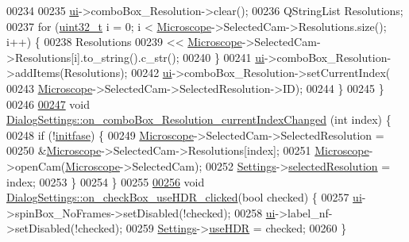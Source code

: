 \begin{DoxyCode}
00234 
00235     \hyperlink{class_dialog_settings_a5b53d91a27cdf68f77e4bdd10b6a9bba}{ui}->comboBox\_Resolution->clear();
00236     QStringList Resolutions;
00237     \textcolor{keywordflow}{for} (\hyperlink{_soil_math_types_8h_a435d1572bf3f880d55459d9805097f62}{uint32\_t} i = 0; i < \hyperlink{class_microscope}{Microscope}->SelectedCam->Resolutions.size(); i++) \{
00238       Resolutions
00239           << \hyperlink{class_microscope}{Microscope}->SelectedCam->Resolutions[i].to\_string().c\_str();
00240     \}
00241     \hyperlink{class_dialog_settings_a5b53d91a27cdf68f77e4bdd10b6a9bba}{ui}->comboBox\_Resolution->addItems(Resolutions);
00242     \hyperlink{class_dialog_settings_a5b53d91a27cdf68f77e4bdd10b6a9bba}{ui}->comboBox\_Resolution->setCurrentIndex(
00243         \hyperlink{class_microscope}{Microscope}->SelectedCam->SelectedResolution->ID);
00244   \}
00245 \}
00246 
\hypertarget{dialogsettings_8cpp_source_l00247}{}\hyperlink{class_dialog_settings_a523a72d25bd4c7623cf8164cb73736d5}{00247} \textcolor{keywordtype}{void} \hyperlink{class_dialog_settings_a523a72d25bd4c7623cf8164cb73736d5}{DialogSettings::on\_comboBox\_Resolution\_currentIndexChanged}
      (\textcolor{keywordtype}{int} index) \{
00248   \textcolor{keywordflow}{if} (!\hyperlink{class_dialog_settings_aeff07458ed6d4469cc16f90971bc5083}{initfase}) \{
00249     \hyperlink{class_microscope}{Microscope}->SelectedCam->SelectedResolution =
00250         &\hyperlink{class_microscope}{Microscope}->SelectedCam->Resolutions[index];
00251     \hyperlink{class_microscope}{Microscope}->openCam(\hyperlink{class_microscope}{Microscope}->SelectedCam);
00252     \hyperlink{class_dialog_settings_ae6b9e42f9108f93c4964be28a7171648}{Settings}->\hyperlink{class_soil_analyzer_1_1_soil_settings_a115a9feb41cc836d28d4ae1ceb536356}{selectedResolution} = index;
00253   \}
00254 \}
00255 
\hypertarget{dialogsettings_8cpp_source_l00256}{}\hyperlink{class_dialog_settings_ae1c807192ce7c417cb7c742d7aa2a4c7}{00256} \textcolor{keywordtype}{void} \hyperlink{class_dialog_settings_ae1c807192ce7c417cb7c742d7aa2a4c7}{DialogSettings::on\_checkBox\_useHDR\_clicked}(\textcolor{keywordtype}{bool} checked) \{
00257   \hyperlink{class_dialog_settings_a5b53d91a27cdf68f77e4bdd10b6a9bba}{ui}->spinBox\_NoFrames->setDisabled(!checked);
00258   \hyperlink{class_dialog_settings_a5b53d91a27cdf68f77e4bdd10b6a9bba}{ui}->label\_nf->setDisabled(!checked);
00259   \hyperlink{class_dialog_settings_ae6b9e42f9108f93c4964be28a7171648}{Settings}->\hyperlink{class_soil_analyzer_1_1_soil_settings_a6851d04a1d2a5acbc99c6d9665c40edf}{useHDR} = checked;
00260 \}

\end{DoxyCode}
